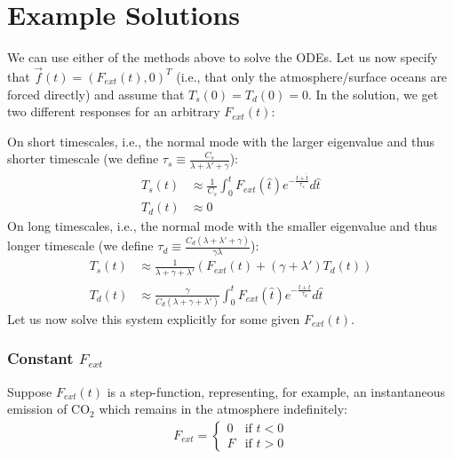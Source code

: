 \section{Example Solutions}\label{Dynamical Systems Solutions}
We can use either of the methods above to solve the ODEs. Let us now specify that $\vec{f}(t)=(F_{ext}(t),0)^T$ (i.e., that only the atmosphere/surface oceans are forced directly) and assume that $T_s(0)=T_d(0)=0$. In the solution, we get two different responses for an arbitrary $F_{ext}(t)$:\vspace{5 mm}

\noindent On short timescales, i.e., the normal mode with the larger eigenvalue and thus shorter timescale (we define $\tau_s\equiv\frac{C_s}{\lambda+\lambda'+\gamma}$): 
\begin{align}
    T_s(t) & \approx \frac{1}{C_s}\int_0^tF_{ext}(\hat{t}) e^{-\frac{t+\hat{t}}{\tau_s}}d\hat{t} \label{T_s short soln} \\ 
    T_d(t)& \approx 0 \label{T_d short soln}
\end{align}
On long timescales, i.e., the normal mode with the smaller eigenvalue and thus longer timescale (we define $\tau_d\equiv\frac{C_d(\lambda+\lambda'+\gamma)}{\gamma\lambda}$):
\begin{align}
    T_s(t) & \approx \frac{1}{\lambda+\gamma+\lambda'}\left(F_{ext}(t)+(\gamma+\lambda ')T_d(t)\right) \\ 
    T_d(t) & \approx \frac{\gamma}{C_d(\lambda+\gamma+\lambda')}\int_0^tF_{ext}(\hat{t}) e^{-\frac{t+\hat{t}}{\tau_d}}d\hat{t}  \label{T_d long step soln}
\end{align}
Let us now solve this system explicitly for some given $F_{ext}(t)$. 

\subsubsection{Constant \texorpdfstring{$F_{ext}$}{F-ext}}

Suppose $F_{ext}(t)$ is a step-function, representing, for example, an instantaneous emission of CO$_2$ which remains in the atmosphere indefinitely:
\begin{align*}
    F_{ext}=
    \begin{cases}
        0 & \text{if } t<0 \\
        F & \text{if } t>0
    \end{cases}
\end{align*}

